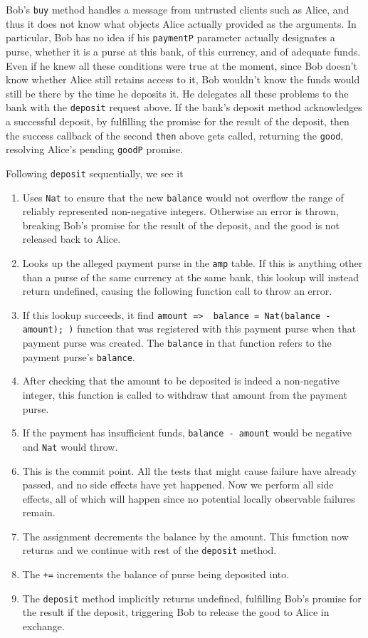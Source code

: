 \documentclass{llncs}
\begin{document}
Bob's {\tt buy} method handles a message from untrusted clients such as Alice, and thus it does not know what objects Alice actually provided as the arguments. In particular, Bob has no idea if his {\tt paymentP} parameter actually designates a purse, whether it is a purse at this bank, of this currency, and of adequate funds. Even if he knew all these conditions were true at the moment, since Bob doesn't know whether Alice still retains access to it, Bob wouldn't know the funds would still be there by the time he deposits it. He delegates all these problems to the bank with the {\tt deposit} request above. If the bank's deposit method acknowledges a successful deposit, by fulfilling the promise for the result of the deposit, then the success callback of the second {\tt then} above gets called, returning the {\tt good}, resolving Alice's pending {\tt goodP} promise.

Following {\tt deposit} sequentially, we see it
\begin{enumerate}
\item Uses {\tt Nat} to ensure that the new {\tt balance} would not overflow the range of reliably represented non-negative integers. Otherwise an error is thrown, breaking Bob's promise for the result of the deposit, and the good is not released back to Alice.
\item Looks up the alleged payment purse in the {\tt amp} table. If this is anything other than a purse of the same currency at the same bank, this lookup will instead return undefined, causing the following function call to throw an error.
\item If this lookup succeeds, it find {\tt amount => { balance = Nat(balance - amount); })} function that was registered with this payment purse when that payment purse was created. The {\tt balance} in that function refers to the payment purse's {\tt balance}. 
\item After checking that the amount to be deposited is indeed a non-negative integer, this function is called to withdraw that amount from the payment purse.
\item If the payment has insufficient funds, {\tt balance - amount} would be negative and {\tt Nat} would throw.
\item This is the commit point. All the tests that might cause failure have already passed, and no side effects have yet happened. Now we perform all side effects, all of which will happen since no potential locally observable failures remain.
\item The assignment decrements the balance by the amount. This function now returns and we continue with rest of the {\tt deposit} method.
\item The {\tt +=} increments the balance of purse being deposited into.
\item The {\tt deposit} method implicitly returns undefined, fulfilling Bob's promise for the result if the deposit, triggering Bob to release the good to Alice in exchange.
\end{enumerate}
\end{document}
